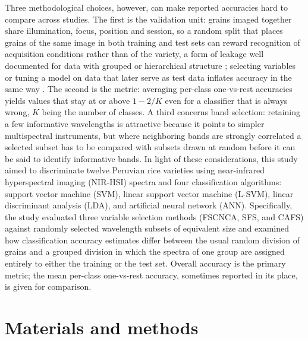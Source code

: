 \documentclass[final,5p,times,twocolumn]{elsarticle}
\begin{document}
Three methodological choices, however, can make reported accuracies hard to compare across studies. The first is the validation unit: grains imaged together share illumination, focus, position and session, so a random split that places grains of the same image in both training and test sets can reward recognition of acquisition conditions rather than of the variety, a form of leakage well documented for data with grouped or hierarchical structure \citep{Roberts2017,Kaufman2012}; selecting variables or tuning a model on data that later serve as test data inflates accuracy in the same way \citep{Varma2006,Westerhuis2008}. The second is the metric: averaging per-class one-vs-rest accuracies yields values that stay at or above $1-2/K$ even for a classifier that is always wrong, $K$ being the number of classes. A third concerns band selection: retaining a few informative wavelengths is attractive because it points to simpler multispectral instruments, but where neighboring bands are strongly correlated a selected subset has to be compared with subsets drawn at random before it can be said to identify informative bands.
In light of these considerations, this study aimed to discriminate twelve Peruvian rice varieties using near-infrared hyperspectral imaging (NIR-HSI) spectra and four classification algorithms: support vector machine (SVM), linear support vector machine (L-SVM), linear discriminant analysis (LDA), and artificial neural network (ANN). Specifically, the study evaluated three variable selection methods (FSCNCA, SFS, and CAFS) against randomly selected wavelength subsets of equivalent size and examined how classification accuracy estimates differ between the usual random division of grains and a grouped division in which the spectra of one group are assigned entirely to either the training or the test set. Overall accuracy is the primary metric; the mean per-class one-vs-rest accuracy, sometimes reported in its place, is given for comparison.




\section{Materials and methods}
\end{document}
